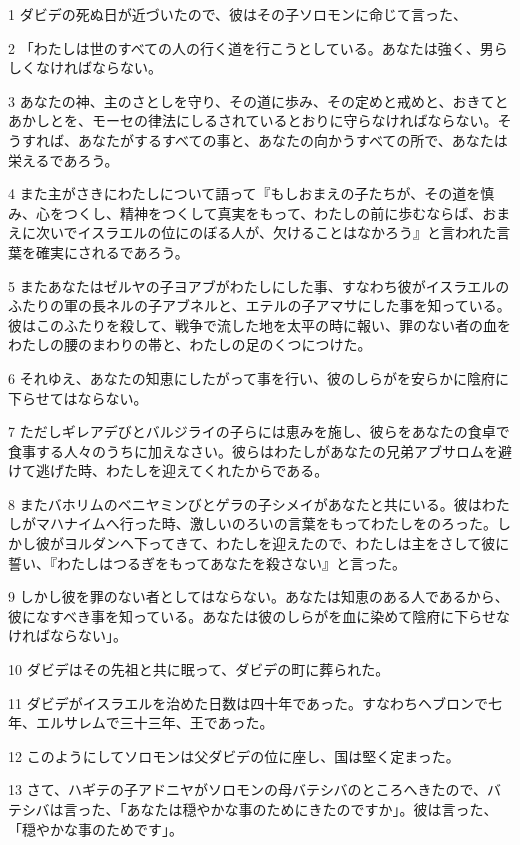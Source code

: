\par 1 ダビデの死ぬ日が近づいたので、彼はその子ソロモンに命じて言った、
\par 2 「わたしは世のすべての人の行く道を行こうとしている。あなたは強く、男らしくなければならない。
\par 3 あなたの神、主のさとしを守り、その道に歩み、その定めと戒めと、おきてとあかしとを、モーセの律法にしるされているとおりに守らなければならない。そうすれば、あなたがするすべての事と、あなたの向かうすべての所で、あなたは栄えるであろう。
\par 4 また主がさきにわたしについて語って『もしおまえの子たちが、その道を慎み、心をつくし、精神をつくして真実をもって、わたしの前に歩むならば、おまえに次いでイスラエルの位にのぼる人が、欠けることはなかろう』と言われた言葉を確実にされるであろう。
\par 5 またあなたはゼルヤの子ヨアブがわたしにした事、すなわち彼がイスラエルのふたりの軍の長ネルの子アブネルと、エテルの子アマサにした事を知っている。彼はこのふたりを殺して、戦争で流した地を太平の時に報い、罪のない者の血をわたしの腰のまわりの帯と、わたしの足のくつにつけた。
\par 6 それゆえ、あなたの知恵にしたがって事を行い、彼のしらがを安らかに陰府に下らせてはならない。
\par 7 ただしギレアデびとバルジライの子らには恵みを施し、彼らをあなたの食卓で食事する人々のうちに加えなさい。彼らはわたしがあなたの兄弟アブサロムを避けて逃げた時、わたしを迎えてくれたからである。
\par 8 またバホリムのベニヤミンびとゲラの子シメイがあなたと共にいる。彼はわたしがマハナイムへ行った時、激しいのろいの言葉をもってわたしをのろった。しかし彼がヨルダンへ下ってきて、わたしを迎えたので、わたしは主をさして彼に誓い、『わたしはつるぎをもってあなたを殺さない』と言った。
\par 9 しかし彼を罪のない者としてはならない。あなたは知恵のある人であるから、彼になすべき事を知っている。あなたは彼のしらがを血に染めて陰府に下らせなければならない」。
\par 10 ダビデはその先祖と共に眠って、ダビデの町に葬られた。
\par 11 ダビデがイスラエルを治めた日数は四十年であった。すなわちヘブロンで七年、エルサレムで三十三年、王であった。
\par 12 このようにしてソロモンは父ダビデの位に座し、国は堅く定まった。
\par 13 さて、ハギテの子アドニヤがソロモンの母バテシバのところへきたので、バテシバは言った、「あなたは穏やかな事のためにきたのですか」。彼は言った、「穏やかな事のためです」。
